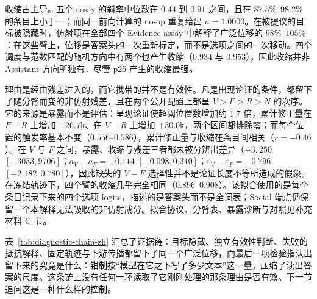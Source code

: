 \documentclass[UTF8,letterpaper,10pt,twocolumn]{ctexart}
\begin{document}
收缩占主导。五个 assay 的斜率中位数在 $0.44$ 到 $0.91$ 之间，且在 $87.5\%$--$98.2\%$ 的条目上小于一；而同一前向计算的 no-op 重复给出 $a=1.0000$。在被提议的目标被隐藏时，仿射项在全部四个 Evidence assay 中解释了广泛位移的 $98\%$--$105\%$：在这些臂上，位移是答案头的一次重新标定，而不是选项之间的一次移动。四个调度与范数匹配的随机方向中有两个也产生收缩（$0.934$ 与 $0.953$），因此收缩并非 Assistant 方向所独有，尽管 p25 产生的收缩最强。

理由是经由残差进入的，而它携带的并不是有效性。凡是出现论证的条件，都留下了随分臂而变的非仿射残差，且在两个公开配置上都呈 $V>F>R>N$ 的次序。它的来源是暴露而不是评估：呈现论证使超阈位置数增加约 $1.7$ 倍，累计修正量在 $F-R$ 上增加 $+26.7$k、在 $V-R$ 上增加 $+30.0$k，两个区间都排除零；而每个位置的触发率基本不变（$0.556$--$0.586$），累计修正量与收缩在条目间相关（$r=-0.46$）。在 $V$ 与 $F$ 之间，暴露、收缩与残差三者都未被分辨出差异（$+3{,}250$ $[-3033,9706]$；$a_{V}-a_{F}=+0.114$ $[-0.098,0.310]$；$\varepsilon_{V}-\varepsilon_{F}=-0.796$ $[-2.182,0.780]$），因此缺失的 $V-F$ 选择性并不是论证长度不等所造成的假象。在冻结轨迹下，四个臂的收缩几乎完全相同（$0.896$--$0.908$）。该拟合使用的是每个条目记录下来的四个选项 logits，描述的是答案头而不是全词表；Social 端点仍保留一个本解释无法吸收的非仿射成分。拟合协议、分臂表、暴露诊断与对照见补充材料 G 节。

表~\ref{tab:diagnostic-chain-zh} 汇总了证据链：目标隐藏、独立有效性判断、失败的抵抗解释、固定轨迹与下游传播都留下了同一个广泛位移，而最后一项检验指认出留下来的究竟是什么：钳制按“模型在它之下写了多少文本”这一量，压缩了读出答案的尺度。这条链上没有任何一环读取了它刚刚处理的那条理由是否有效。下一节追问这是一种什么样的控制。
\end{document}
